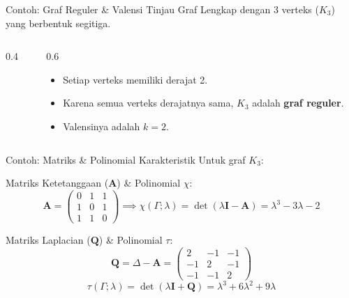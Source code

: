 ﻿\documentclass[aspectratio=169]{beamer}
\begin{document}
\begin{frame}[fragile]{Contoh: Graf Reguler \& Valensi}
  Tinjau Graf Lengkap dengan 3 verteks ($K_3$) yang berbentuk segitiga.

  \begin{columns}[T]
    \begin{column}{0.4\textwidth}
      \begin{center}
        \vspace{0.5cm}
      \end{center}
    \end{column}
    \begin{column}{0.6\textwidth}
      \begin{itemize}
        \item Setiap verteks memiliki derajat 2.
        \item Karena semua verteks derajatnya sama, $K_3$ adalah \textbf{graf reguler}.
        \item Valensinya adalah $k = 2$.
      \end{itemize}
    \end{column}
  \end{columns}
\end{frame}

\begin{frame}{Contoh: Matriks \& Polinomial Karakteristik}
  Untuk graf $K_3$:

  Matriks Ketetanggaan ($\mathbf{A}$) \& Polinomial $\chi$:
  $$ \mathbf{A} = \begin{pmatrix} 0 & 1 & 1 \\ 1 & 0 & 1 \\ 1 & 1 & 0 \end{pmatrix} \implies \chi(\Gamma; \lambda) = \det(\lambda \mathbf{I} - \mathbf{A}) = \lambda^3 - 3\lambda - 2 $$

  Matriks Laplacian ($\mathbf{Q}$) \& Polinomial $\tau$:
  $$ \mathbf{Q} = \Delta - \mathbf{A} = \begin{pmatrix} 2 & -1 & -1 \\ -1 & 2 & -1 \\ -1 & -1 & 2 \end{pmatrix} $$
  $$ \tau(\Gamma; \lambda) = \det(\lambda \mathbf{I} + \mathbf{Q}) = \lambda^3 + 6\lambda^2 + 9\lambda $$
\end{frame}
\end{document}
